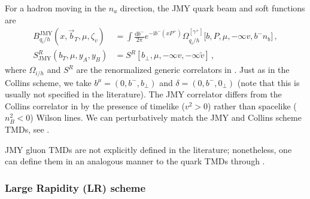 \documentclass[11pt,a4paper]{article}
\newcommand{\df}{\mathrm{d}}
\newcommand{\img}{\mathrm{i}}
\newcommand{\nn}{\nonumber}
\newcommand{\bt}{\vec b_T}
\newcommand{\tv}{{\tilde v}}
\newcommand{\Corr}{\Omega}
\newcommand{\q}{q_i}
\newcommand{\na}{n_a}
\newcommand{\JMY}{\mathrm{JMY}}
\begin{document}
For a hadron moving in the $\na$ direction, the JMY quark beam and soft functions are
\begin{align} \label{eq:def_JMY}
 B_{\q/h}^\JMY(x, \bt, \mu, \zeta_v) &
 = \int\!\frac{\df b^-}{2\pi} e^{-\img b^- (x P^+)}
   \Corr_{\q/h}^{[\gamma^+]}\bigl[b, P, \mu, -\infty v, b^- n_b \bigr]
\,,\nn\\
 S_\JMY^R(b_T,\mu, y_A, y_B) &
 = S^R[b_\perp, \mu, -\infty v, -\infty \tv]
\,,\end{align}
where $\Corr_{i/h}$ and $S^R$ are the renormalized generic correlators in .
Just as in the Collins scheme, we take $b^\mu = (0, b^-, b_\perp)$ and $\delta = (0, b^-, 0_\perp)$ (note that this is usually not specified in the literature).
The JMY correlator differs from the Collins correlator in  by the presence of timelike ($v^2 > 0$) rather than spacelike ($n_B^2 < 0$) Wilson lines.
We can perturbatively match the JMY and Collins scheme TMDs, see .

JMY gluon TMDs are not explicitly defined in the literature; nonetheless,
one can define them in an analogous manner to the quark TMDs through .


\subsubsection{Large Rapidity (LR) scheme}
\label{sec:lr-scheme}
\end{document}
